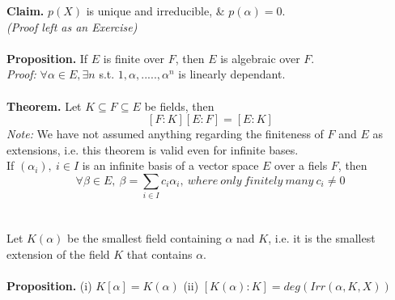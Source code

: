 \documentclass[twoside]{article}
\begin{document}
    \noindent
    {\bf Claim.} $p(X)$ is unique and irreducible, \& $p(\alpha)=0$.\\
    {\it (Proof left as an Exercise)}\\ 
    \\ \noindent
    {\bf Proposition.} If $E$ is finite over $F$, then $E$ is algebraic over $F$.\\
    {\it Proof:} $\forall\alpha\in E, \exists n$ s.t. $1,\alpha, ..... , {\alpha}^n$ is linearly dependant.\\
    \\ \noindent
    {\bf Theorem.} Let $K\subseteq F\subseteq E$ be fields, then $$ [F:K][E:F]=[E:K]$$
    {\it Note:} We have not assumed anything regarding the finiteness of $F$ and $E$ as extensions, i.e. this theorem is valid even for infinite bases.\\
    If $({\alpha}_i),\ i\in I$ is an infinite basis of a vector space $E$ over a fiels $F$, then $$\forall \beta\in E,\ \beta = \sum_{i\in I}{c_i}{{\alpha}_i},\  where\ only\ finitely\ many\ c_i\neq0$$\\
    \\ \noindent
    Let $K(\alpha)$ be the smallest field containing $\alpha$ nad $K$, i.e. it is the smallest extension of the field $K$ that contains $\alpha$.\\
    \\ \noindent
    {\bf Proposition.} (i) $K[\alpha] = K(\alpha)$ \hspace{1.5cm} (ii) $[K(\alpha):K]=deg(Irr(\alpha,K,X))$
\end{document}
